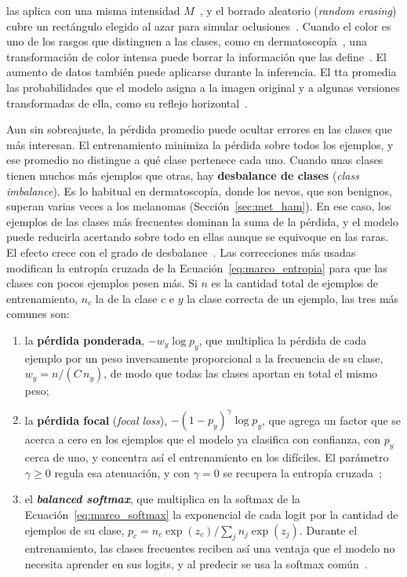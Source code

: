\begin{itemize}
    las aplica con una misma intensidad $M$~\cite{cubuk2020randaugment}, y el borrado aleatorio (\emph{random
    erasing}) cubre un rectángulo elegido al azar para simular oclusiones~\cite{zhong2020random}. Cuando el
    color es uno de los rasgos que distinguen a las clases, como en dermatoscopía~\cite{kittler2016standardization},
    una transformación de color intensa puede borrar la información que las define~\cite{shorten2019survey}.
    El aumento de datos también puede aplicarse durante la inferencia. El \gls{tta} promedia las
    probabilidades que el modelo asigna a la imagen original y a algunas versiones transformadas de ella, como
    su reflejo horizontal~\cite{krizhevsky2012imagenet}.
\end{itemize}

Aun sin sobreajuste, la pérdida promedio puede ocultar errores en las clases que más interesan. El
entrenamiento minimiza la pérdida sobre todos los ejemplos, y ese promedio no distingue a qué clase pertenece
cada uno. Cuando unas clases tienen muchos más ejemplos que otras, hay \textbf{desbalance de clases}
(\emph{class imbalance})\label{sec:marco_desbalance}. Es lo habitual en dermatoscopía, donde los nevos, que son
benignos, superan varias veces a los melanomas (Sección~\ref{sec:met_ham}).
En ese caso, los ejemplos de las clases más frecuentes dominan la suma de la pérdida, y el modelo puede reducirla
acertando sobre todo en ellas aunque se equivoque en las raras. El efecto crece con el grado de
desbalance~\cite{buda2018systematic}. Las correcciones más usadas modifican la entropía cruzada de la
Ecuación~\ref{eq:marco_entropia} para que las clases con pocos ejemplos pesen más. Si $n$ es la cantidad total
de ejemplos de entrenamiento, $n_c$ la de la clase $c$ e $y$ la clase correcta de un ejemplo, las tres más
comunes son:
\begin{enumerate}
    \item la \textbf{pérdida ponderada}, $-w_y \log p_y$, que multiplica la pérdida de cada ejemplo por un peso
    inversamente proporcional a la frecuencia de su clase, $w_y = n/(C\,n_y)$, de modo que todas las clases
    aportan en total el mismo peso;
    \item la \textbf{pérdida focal} (\emph{focal loss}), $-(1-p_y)^{\gamma}\log p_y$, que agrega un factor que se
    acerca a cero en los ejemplos que el modelo ya clasifica con confianza, con $p_y$ cerca de uno, y concentra
    así el entrenamiento en los difíciles. El parámetro $\gamma \ge 0$ regula esa atenuación, y con $\gamma = 0$
    se recupera la entropía cruzada~\cite{lin2017focal};
    \item el \textbf{\emph{balanced softmax}}, que multiplica en la softmax de la Ecuación~\ref{eq:marco_softmax}
    la exponencial de cada logit por la cantidad de ejemplos de su clase,
    $p_c = n_c \exp(z_c) / \sum_{j} n_j \exp(z_j)$. Durante el entrenamiento, las clases frecuentes reciben así
    una ventaja que el modelo no necesita aprender en sus logits, y al predecir se usa la softmax
    común~\cite{ren2020balanced}.
\end{enumerate}
